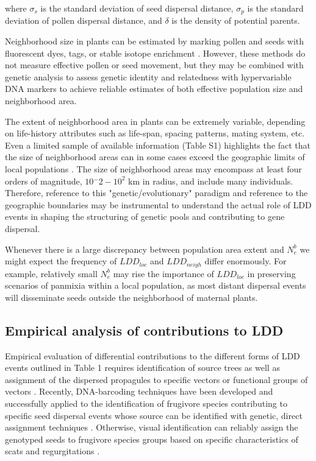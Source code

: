 \documentclass[a4paper, 12pt]{article}
\begin{document}
\begin{linenumbers}
where $\sigma_s$ is the standard deviation of seed dispersal distance, $\sigma_p$ is the standard deviation of pollen dispersal distance, and $\delta$ is the density of potential parents.

Neighborhood size in plants can be estimated by marking pollen and seeds with fluorescent dyes, tags, or stable isotope enrichment \citep{Carlo:2009wa}. However, these methods do not measure effective pollen or seed movement, but they may be combined with genetic analysis to assess genetic identity and relatedness with hypervariable DNA markers \citep{Levin:1988fm,Nason:1998aa,Godoy:2001} to achieve reliable estimates of both effective population size and neighborhood area. 

The extent of neighborhood area in plants can be extremely variable, depending on life-history attributes such as life-span, spacing patterns, mating system, etc. Even a limited sample of available information (Table S1) highlights the fact that the size of neighborhood areas can in some cases exceed the geographic limits of local populations \citep{Nason:1998aa}. The size of neighborhood areas may encompass at least four orders of magnitude, $10{^-2}-10^2$ km in radius, and include many individuals. Therefore, reference to this "genetic/evolutionary" paradigm and reference to the geographic boundaries \citep[sensu][]{Waples:2006ev} may be instrumental to understand the actual role of LDD events in shaping the structuring of genetic pools and contributing to gene dispersal. 

Whenever there is a large discrepancy between population area extent and $N^b_e$ we might expect the frequency of $LDD_{loc}$ and $LDD_{neigh}$ differ enormously. For example, relatively small $N^b_e$ may rise the importance of $LDD_{loc}$ in preserving scenarios of panmixia within a local population, as most distant dispersal events will disseminate seeds outside the neighborhood of maternal plants.


\subsection*{Empirical analysis of contributions to LDD}

Empirical evaluation of differential contributions to the different forms of LDD events outlined in Table 1 requires identification of source trees as well as assignment of the dispersed propagules to specific vectors or functional groups of vectors \citep{Jordano:2007}. Recently, DNA-barcoding techniques have been developed and successfully applied to the identification of frugivore species contributing to specific seed dispersal events whose source can be identified with genetic, direct assignment techniques \citep{GonzalezVaro:2014ij}. Otherwise, visual identification can reliably assign the genotyped seeds to frugivore species groups based on specific characteristics of scats and regurgitations \citep{Jordano:2007}. 


\end{linenumbers}
\end{document}
